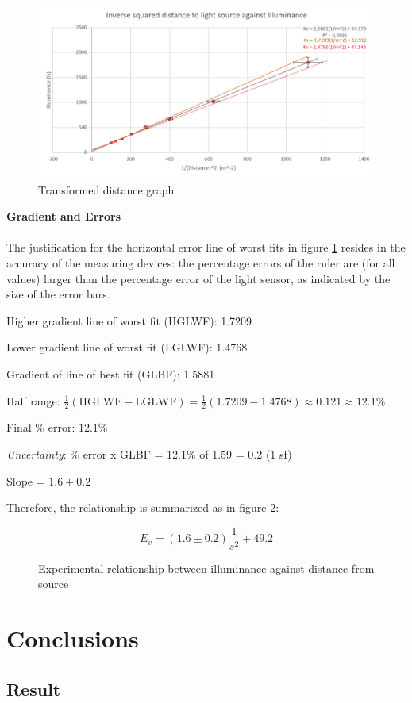 \documentclass[a4paper,12pt]{article}
\newcommand{\paragraphnl}[1]{\textbf{#1}\\\\}
\begin{document}
\begin{figure}[H]
    \centering
    \includegraphics[width=\textwidth]{assets/transformgraph.png}
    \caption{Transformed distance graph}
    \label{gph:tdata}
\end{figure}

\paragraphnl{Gradient and Errors}
The justification for the horizontal error line of worst fits in figure \ref{gph:tdata} resides in the accuracy of the measuring devices: the percentage errors of the ruler are (for all values) larger than the percentage error of the light sensor, as indicated by the size of the error bars.


Higher gradient line of worst fit (HGLWF): 1.7209

Lower gradient line of worst fit (LGLWF): 1.4768

Gradient of line of best fit (GLBF): 1.5881

Half range: $\frac{1}{2} (\text{HGLWF} - \text{LGLWF})= \frac{1}{2}(1.7209-1.4768) \approx 0.121 \approx 12.1\% $

Final \% error: $12.1\%$

\textit{Uncertainty}: \% error x GLBF = 12.1\% of $1.59$ = 0.2 (1 sf)

Slope = $1.6 \pm 0.2$

Therefore, the relationship is summarized as in figure \ref{fig:rel}:
\begin{figure}[h!]
    \[
       E_v = (1.6 \pm 0.2) \frac{1}{s^2} + 49.2
    \]
    \caption{Experimental relationship between illuminance against distance from source}
    \label{fig:rel}
\end{figure}

\section{Conclusions}
\subsection{Result}
\end{document}
